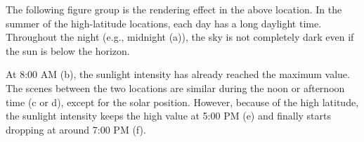 \documentclass{article}
\begin{document}
The following figure group is the rendering effect in the above location. In the summer of the high-latitude locations,
each day has a long daylight time. Throughout the night (e.g., midnight (a)), the sky is not completely dark even if
the sun is below the horizon. 

At 8:00 AM (b), the sunlight intensity has already reached the maximum value. The scenes between the two locations are 
similar during the noon or afternoon time (c or d), except for the solar position. However, because of the high latitude,
the sunlight intensity keeps the high value at 5:00 PM (e) and finally starts dropping at around 7:00 PM (f).

\begin{figure}[h]
  \centering
  \hfill
  \hfill
  

\end{figure}
\end{document}

